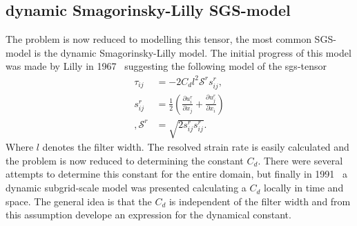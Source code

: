 \subsection{dynamic Smagorinsky-Lilly SGS-model}
The problem is now reduced to modelling this tensor, the most common SGS-model is the 
dynamic Smagorinsky-Lilly model. The initial progress of this model was made by 
Lilly in 1967~\cite{Lilly67} suggesting the following model of the sgs-tensor
%
\begin{align}
    \tau_{ij} &= -2C_dl^2\mathcal{S}^rs_{ij}^r,\\
    s^r_{ij} &= \frac{1}{2}\left( \frac{\partial u^r_i}{\partial x_j} +
    \frac{\partial u^r_j}{\partial x_i}\right)\\,
    \mathcal{S}^r &= \sqrt{2s^r_{ij}s^r_{ij}}.
    \label{eq:boussinesq}
\end{align}
%
Where $l$ denotes the filter width.
The resolved strain rate is easily calculated and the problem is now reduced to determining
the constant $C_d$. There were several attempts to determine this constant for the entire domain,
but finally in 1991~\cite{Germano91} a dynamic subgrid-scale model was presented calculating a 
$C_d$ locally in time and space. The general idea is that the $C_d$ is independent of the 
filter width and from this assumption develope an expression for the dynamical constant.


